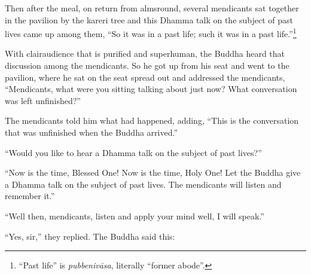 \documentclass[12pt,openany]{book}%
\begin{document}
Then after the meal, on return from almsround, several mendicants sat together in the pavilion by the kareri tree and this Dhamma talk on the subject of past lives came up among them, “So it was in a past life; such it was in a past life.”\footnote{“Past life” is \textit{\textsanskrit{pubbenivāsa}}, literally “former abode”. } 

With clairaudience that is purified and superhuman, the Buddha heard that discussion among the mendicants. So he got up from his seat and went to the pavilion, where he sat on the seat spread out and addressed the mendicants, “Mendicants, what were you sitting talking about just now? What conversation was left unfinished?” 

The mendicants told him what had happened, adding, “This is the conversation that was unfinished when the Buddha arrived.” 

“Would you like to hear a Dhamma talk on the subject of past lives?” 

“Now is the time, Blessed One! Now is the time, Holy One! Let the Buddha give a Dhamma talk on the subject of past lives. The mendicants will listen and remember it.” 

“Well then, mendicants, listen and apply your mind well, I will speak.” 

“Yes, sir,” they replied. The Buddha said this: 
\end{document}
